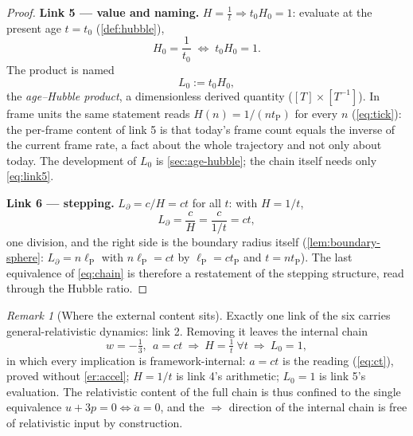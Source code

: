 \documentclass[11pt]{amsbook}
\theoremstyle{plain}
\theoremstyle{definition}
\theoremstyle{remark}
\newtheorem{remark}[theorem]{Remark}
\begin{document}
\begin{proof}
\textbf{Link 5 --- value and naming.} $H = \tfrac1t \Rightarrow t_{0}H_{0} = 1$: evaluate at the present age $t = t_{0}$ (\cref{def:hubble}),
\begin{equation}\label{eq:link5}
H_{0} = \frac{1}{t_{0}} \;\Leftrightarrow\; t_{0}H_{0} = 1 .
\end{equation}
The product is named
\begin{equation}\label{eq:L0}
L_{0} := t_{0}H_{0},
\end{equation}
the \emph{age--Hubble product}, a dimensionless derived quantity ($[T]\times[T^{-1}]$). In frame units the same statement reads $H(n) = 1/(n t_{\mathrm P})$ for every $n$ (\cref{eq:tick}): the per-frame content of link 5 is that today's frame count equals the inverse of the current frame rate, a fact about the whole trajectory and not only about today. The development of $L_{0}$ is \cref{sec:age-hubble}; the chain itself needs only \cref{eq:link5}.

\textbf{Link 6 --- stepping.} $L_{\partial} = c/H = ct$ for all $t$: with $H = 1/t$,
\begin{equation}\label{eq:link6}
L_{\partial} = \frac{c}{H} = \frac{c}{1/t} = ct,
\end{equation}
one division, and the right side is the boundary radius itself (\cref{lem:boundary-sphere}: $L_{\partial} = n\ell_{\mathrm P}$ with $n\ell_{\mathrm P} = ct$ by $\ell_{\mathrm P} = ct_{\mathrm P}$ and $t = nt_{\mathrm P}$). The last equivalence of \cref{eq:chain} is therefore a restatement of the stepping structure, read through the Hubble ratio.
\end{proof}

\begin{remark}[Where the external content sits]\label{rem:gr-content}
Exactly one link of the six carries general-relativistic dynamics: link 2. Removing it leaves the internal chain
\begin{equation}\label{eq:internal-chain}
w = -\tfrac13,\ \ a = ct \ \Longrightarrow\ H = \tfrac1t\ \forall t\ \Longrightarrow\ L_{0} = 1,
\end{equation}
in which every implication is framework-internal: $a = ct$ is the reading (\cref{eq:ct}), proved without \cref{er:accel}; $H = 1/t$ is link 4's arithmetic; $L_{0} = 1$ is link 5's evaluation. The relativistic content of the full chain is thus confined to the single equivalence $u + 3p = 0 \Leftrightarrow \ddot a = 0$, and the $\Rightarrow$ direction of the internal chain is free of relativistic input by construction.
\end{remark}
\end{document}
